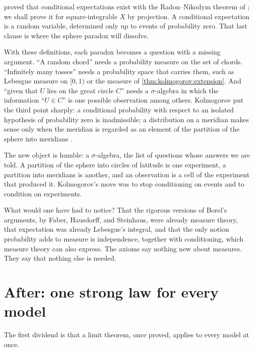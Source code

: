 \begin{refsection}
\textcite{Kolmogorov1933} proved that conditional expectations exist with the Radon--Nikodym theorem of \textcite{Nikodym1930}; we shall prove it for square-integrable $X$ by projection. A conditional expectation is a random variable, determined only up to events of probability zero. That last clause is where the sphere paradox will dissolve.

With these definitions, each paradox becomes a question with a missing argument. ``A random chord'' needs a probability measure on the set of chords. ``Infinitely many tosses'' needs a probability space that carries them, such as Lebesgue measure on $[0,1)$ or the measure of \cref{thm:kolmogorov:extension}. And ``given that $U$ lies on the great circle $C$'' needs a $\sigma$-algebra in which the information ``$U\in C$'' is one possible observation among others. Kolmogorov put the third point sharply: a conditional probability with respect to an isolated hypothesis of probability zero is inadmissible; a distribution on a meridian makes sense only when the meridian is regarded as an element of the partition of the sphere into meridians \parencite[Chapter~V, §2]{Kolmogorov1956}.

The new object is humble: a $\sigma$-algebra, the list of questions whose answers we are told. A partition of the sphere into circles of latitude is one experiment, a partition into meridians is another, and an observation is a cell of the experiment that produced it. Kolmogorov's move was to stop conditioning on events and to condition on experiments.

What would one have had to notice? That the rigorous versions of Borel's arguments, by Faber, Hausdorff, and Steinhaus, were already measure theory, that expectation was already Lebesgue's integral, and that the only notion probability adds to measure is independence, together with conditioning, which measure theory can also express. The axioms say nothing new about measures. They say that nothing else is needed.

\section{After: one strong law for every model}\label{sec:kolmogorov:limits}

The first dividend is that a limit theorem, once proved, applies to every model at once.


\end{refsection}
